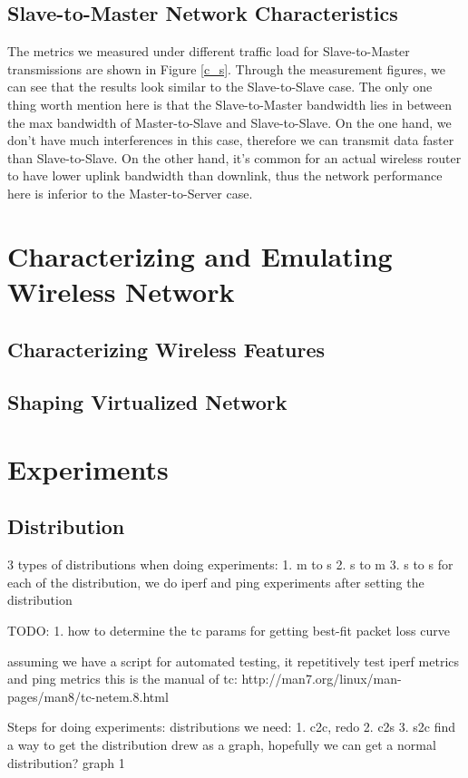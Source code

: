 \documentclass[journal,comsoc]{IEEEtran}
\begin{document}
\subsection{Slave-to-Master Network Characteristics}
The metrics we measured under different traffic load for Slave-to-Master transmissions are shown in Figure \ref{c_s}. Through the measurement figures, we can see that the results look similar to the Slave-to-Slave case. The only one thing worth mention here is that the Slave-to-Master bandwidth lies in between the max bandwidth of Master-to-Slave and Slave-to-Slave. On the one hand, we don't have much interferences in this case, therefore we can transmit data faster than Slave-to-Slave. On the other hand, it's common for an actual wireless router to have lower uplink bandwidth than downlink, thus the network performance here is inferior to the Master-to-Server case.

\section{Characterizing and Emulating Wireless Network}
\subsection{Characterizing Wireless Features}

\subsection{Shaping Virtualized Network}

\section{Experiments}
\subsection{Distribution}
3 types of distributions when doing experiments:
1. m to s
2. s to m
3. s to s
for each of the distribution, we do iperf and ping experiments after setting the distribution

TODO:
1. how to determine the tc params for getting best-fit packet loss curve

assuming we have a script for automated testing, it repetitively test iperf metrics and ping metrics
this is the manual of tc:
http://man7.org/linux/man-pages/man8/tc-netem.8.html

Steps for doing experiments:
distributions we need:
1. c2c, redo
2. c2s
3. s2c
find a way to get the distribution drew as a graph, hopefully we can get a normal distribution?
graph 1
\end{document}
